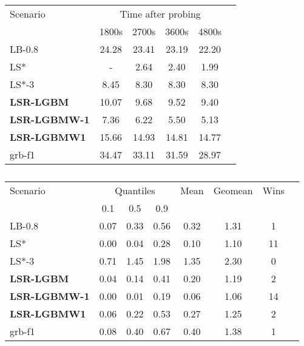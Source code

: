 \documentclass[3p, authoryear, times, doubleblind]{elsarticle}
\begin{document}
{\begin{table}[h]
\centering
\caption{}
\label{tab:fcn:gap_over_time_GT}
\begin{tabular}{lccccc}
\toprule
{Scenario} & \multicolumn{4}{c}{Time after probing} \\
{} & {1800s} & {2700s} & {3600s} & {4800s} \\
\midrule
LB-0.8 & 24.28 & 23.41 & 23.19 & 22.20 \\
LS* & - & 2.64 & 2.40 & 1.99 \\
LS*-3 & 8.45 & 8.30 & 8.30 & 8.30 \\
\textbf{LSR-LGBM} & 10.07 & 9.68 & 9.52 & 9.40 \\
\textbf{LSR-LGBMW-1} & 7.36 & 6.22 & 5.50 & 5.13 \\
\textbf{LSR-LGBMW1} & 15.66 & 14.93 & 14.81 & 14.77 \\
grb-f1 & 34.47 & 33.11 & 31.59 & 28.97 \\
\bottomrule
\end{tabular}
\end{table}


\begin{table}[h]
\centering
\caption{}
\label{tab:primal_gap_ml_B_2-hour}
\begin{tabular}{lccccccc}
\toprule
{Scenario} & \multicolumn{3}{c}{Quantiles} & {Mean} & {Geomean} & {Wins} \\
{} & {0.1} & {0.5} & {0.9} & {} & {} & {} \\
\midrule
LB-0.8 & 0.07 & 0.33 & 0.56 & 0.32 & 1.31 & 1 \\
LS* & 0.00 & 0.04 & 0.28 & 0.10 & 1.10 & 11 \\
LS*-3 & 0.71 & 1.45 & 1.98 & 1.35 & 2.30 & 0 \\
\textbf{LSR-LGBM} & 0.04 & 0.14 & 0.41 & 0.20 & 1.19 & 2 \\
\textbf{LSR-LGBMW-1} & 0.00 & 0.01 & 0.19 & 0.06 & 1.06 & 14 \\
\textbf{LSR-LGBMW1} & 0.06 & 0.22 & 0.53 & 0.27 & 1.25 & 2 \\
grb-f1 & 0.08 & 0.40 & 0.67 & 0.40 & 1.38 & 1 \\
\bottomrule
\end{tabular}
\end{table}


}
\end{document}
